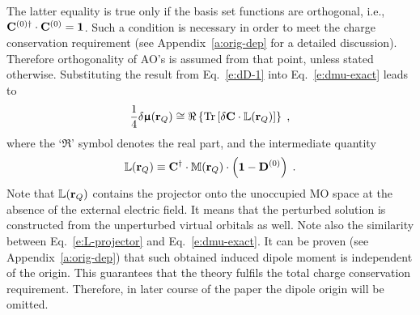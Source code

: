 \documentclass[aip,amsmath,amssymb,reprint,floatfix]{revtex4-1}
\newcommand{\BM}[1]{\bm{#1}}
\DeclareMathOperator{\Tr}{Tr}
\begin{document}
%
The latter equality is true only if the basis set functions are orthogonal, i.e., 
${\bf C}^{(0)\dagger} \cdot {\bf C}^{(0)}={\bf 1}$.
Such a condition is necessary in order to meet the charge conservation
requirement (see Appendix~\ref{a:orig-dep} for a detailed discussion).
Therefore orthogonality of AO's is assumed from that point, unless stated otherwise.
Substituting the result from Eq.~\eqref{e:dD-1}
into Eq.~\eqref{e:dmu-exact} leads to
%
%
%
\begin{equation}\label{e:dmu-l-vector}
 \frac{1}{4} 
 \delta {\BM{\upmu}}({\bf r}_Q)
  \cong
  \Re \left\{ 
 \Tr{ 
    \left[ 
         \delta {\bf C} \cdot \mathbb{L}({\bf r}_Q)
   \right] }  
  \right\} \;,
\end{equation}
%
where the `$\Re$' symbol denotes the real part,
 and the intermediate quantity
%
\begin{equation} \label{e:L-projector}
 \mathbb{L}({\bf r}_Q) \equiv {\bf C}^{\dagger} \cdot \mathbb{M}({\bf r}_Q) \cdot \left( {\bf 1} - {\bf D}^{(0)} \right) \;.
\end{equation}
%
Note that $\mathbb{L}({\bf r}_Q)$ contains the projector onto
the unoccupied MO space at the absence of the external electric field. It means that the
perturbed solution is constructed from the unperturbed virtual orbitals as well.
Note also the similarity between Eq.~\eqref{e:L-projector} and Eq.~\eqref{e:dmu-exact}.
It can be proven (see Appendix~\ref{a:orig-dep}) that such obtained
induced dipole moment is independent of the origin. 
This guarantees that the theory fulfils the total charge conservation requirement.
Therefore, in later course of the paper the dipole origin will be omitted. 
\end{document}
